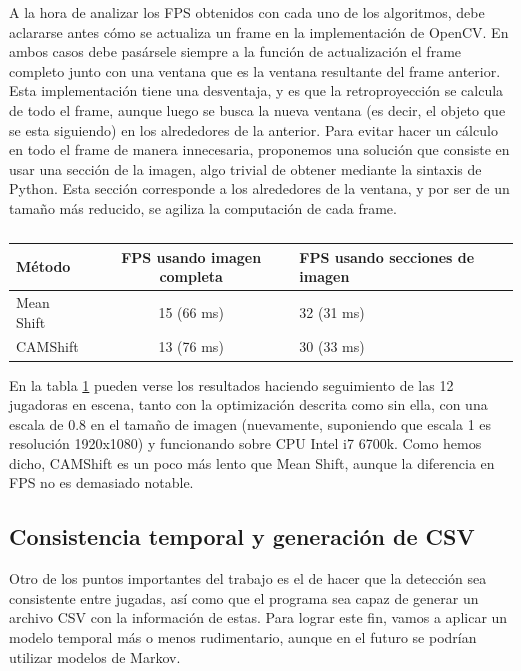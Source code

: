 A la hora de analizar los FPS obtenidos con cada uno de los algoritmos, debe aclararse antes cómo se actualiza un frame en la implementación de OpenCV. En ambos casos debe pasársele siempre a la función de actualización el frame completo junto con una ventana que es la ventana resultante del frame anterior. Esta implementación tiene una desventaja, y es que la retroproyección se calcula de todo el frame, aunque luego se busca la nueva ventana (es decir, el objeto que se esta siguiendo) en los alrededores de la anterior. Para evitar hacer un cálculo en todo el frame de manera innecesaria, proponemos una solución que consiste en usar una sección de la imagen, algo trivial de obtener mediante la sintaxis de Python. Esta sección corresponde a los alrededores de la ventana, y por ser de un tamaño más reducido, se agiliza la computación de cada frame.

\begin{table}
  \centering
  \begin{tabular}{|l|c|l|}\hline
  \textbf{Método} & \multicolumn{1}{m{4cm}|}{\textbf{FPS usando imagen completa}}&  \multicolumn{1}{m{4cm}|}{\textbf{FPS usando secciones de imagen}}\\\hline
  Mean Shift & 15 (66 ms) & 32 (31 ms) \\\hline
  CAMShift & 13 (76 ms)& 30 (33 ms)\\\hline
  \end{tabular}
\caption{}
\label{tab:2}
\end{table}

En la tabla \ref{tab:2} pueden verse los resultados haciendo seguimiento de las 12 jugadoras en escena, tanto con la optimización descrita como sin ella, con una escala de 0.8 en el tamaño de imagen (nuevamente, suponiendo que escala 1 es resolución 1920x1080) y funcionando sobre CPU Intel i7 6700k. Como hemos dicho, CAMShift es un poco más lento que Mean Shift, aunque la diferencia en FPS no es demasiado notable.

\subsection{Consistencia temporal y generación de CSV}
Otro de los puntos importantes del trabajo es el de hacer que la detección sea consistente entre jugadas, así como que el programa sea capaz de generar un archivo CSV con la información de estas. Para lograr este fin, vamos a aplicar un modelo temporal más o menos rudimentario, aunque en el futuro se podrían utilizar modelos de Markov.

